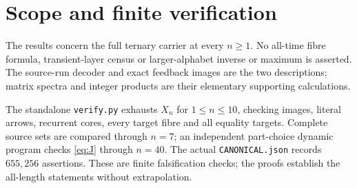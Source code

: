 \section{Scope and finite verification}
The results concern the full ternary carrier at every $n\ge1$. No
all-time fibre formula, transient-layer census or larger-alphabet inverse
or maximum is asserted. The source-run decoder and exact feedback images
are the two descriptions; matrix spectra and integer products are their
elementary supporting calculations.

The standalone \texttt{verify.py} exhausts $X_n$ for $1\le n\le10$,
checking images, literal arrows, recurrent cores, every target fibre and
all equality targets. Complete source sets are compared through $n=7$;
an independent part-choice dynamic program checks \eqref{eq:J} through
$n=40$. The actual \texttt{CANONICAL.json} records $655{,}256$ assertions.
These are finite falsification checks; the proofs establish the all-length
statements without extrapolation.
